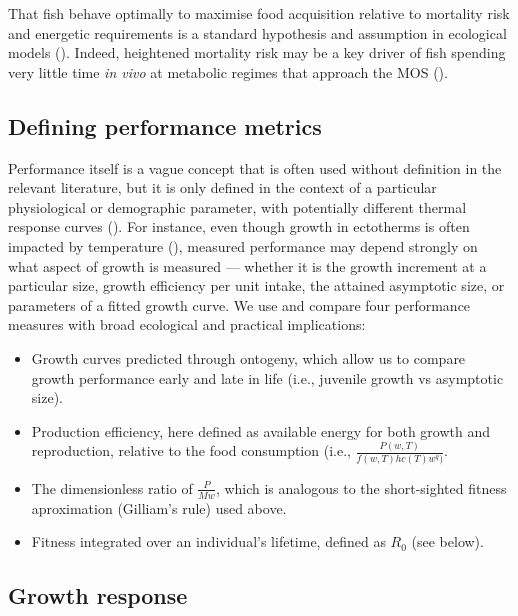 \documentclass[11pt]{article}\usepackage[]{graphicx}\usepackage[]{color,soul}
\begin{document}
That fish behave optimally to maximise food acquisition relative to mortality risk and energetic requirements is a standard hypothesis and assumption in ecological models (\citealt{gilliam_habitat_1987,sainmont_effective_2015,priede_natural_1977, claireaux_influence_2000,hufnagl_physiological_2011}). Indeed, heightened mortality risk may be a key driver of fish spending very little time \emph{in vivo} at metabolic regimes that approach the MOS (\citealt{priede_natural_1977}). 


\subsection*{Defining performance metrics}

Performance itself is a vague concept that is often used without definition in the relevant literature, but it is only defined in the context of a particular physiological or demographic parameter, with potentially different thermal response curves (\citealt{jutfelt_oxygen-and_2018}). For instance, even though growth in ectotherms is often impacted by temperature (\citealt{angilletta_temperature_2004}), measured performance may depend strongly on what aspect of growth is measured --- whether it is the growth increment at a particular size, growth efficiency per unit intake, the attained asymptotic size, or parameters of a fitted growth curve. We use and compare four performance measures with broad ecological and practical implications:

\begin{itemize}

\item Growth curves predicted through ontogeny, which allow us to compare growth performance early and late in life (i.e., juvenile growth vs asymptotic size).
\item Production efficiency, here defined as available energy for both growth and reproduction, relative to the food consumption (i.e., $\frac{P(w,T)}{f(w,T)h c(T) w^q)}$.
\item The dimensionless ratio of $\frac{P}{Mw}$, which is analogous to the short-sighted fitness aproximation (Gilliam's rule) used above.
\item Fitness integrated over an individual's lifetime, defined as $R_0$ (see below).

\end{itemize}

\subsection*{Growth response}
\end{document}
